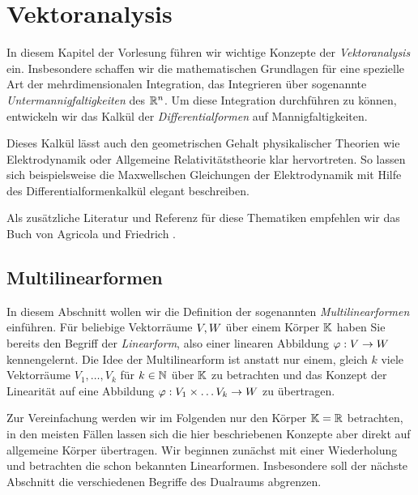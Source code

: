 \chapter{Vektoranalysis}
\label{\detokenize{vektoranalysis/vektoranalysis:vektoranalysis}}\label{\detokenize{vektoranalysis/vektoranalysis::doc}}
\par
In diesem Kapitel der Vorlesung führen wir wichtige Konzepte der \emph{Vektoranalysis} ein.
Insbesondere schaffen wir die mathematischen Grundlagen für eine spezielle Art der mehrdimensionalen Integration, das Integrieren über sogenannte \emph{Untermannigfaltigkeiten} des \(\mathbb{R}^n\).
Um diese Integration durchführen zu können, entwickeln wir das Kalkül der \emph{Differentialformen} auf Mannigfaltigkeiten.

\par
Dieses Kalkül lässt auch den geometrischen Gehalt physikalischer Theorien wie Elektrodynamik oder Allgemeine Relativitätstheorie klar hervortreten.
So lassen sich beispielsweise die Maxwellschen Gleichungen der Elektrodynamik mit Hilfe des Differentialformenkalkül elegant beschreiben.

\par
Als zusätzliche Literatur und Referenz für diese Thematiken empfehlen wir das Buch von Agricola und Friedrich \cite{AF13}.


\section{Multilinearformen}
\label{\detokenize{vektoranalysis/multilinear:multilinearformen}}\label{\detokenize{vektoranalysis/multilinear:s-multilinearformen}}\label{\detokenize{vektoranalysis/multilinear::doc}}
\par
In diesem Abschnitt wollen wir die Definition der sogenannten \emph{Multilinearformen} einführen.
Für beliebige Vektorräume \(V, W\) über einem Körper \(\mathbb{K}\) haben Sie bereits den Begriff der \emph{Linearform}, also einer linearen Abbildung \(\varphi:V\rightarrow W\) kennengelernt.
Die Idee der Multilinearform ist anstatt nur einem, gleich \(k\) viele Vektorräume \(V_1,\ldots,V_k\) für \(k \in \mathbb{N}\) über \(\mathbb{K}\) zu betrachten und das Konzept der Linearität auf eine Abbildung \(\varphi:V_1\times\ldots V_k\rightarrow W\) zu übertragen.

\par
Zur Vereinfachung werden wir im Folgenden nur den Körper \(\mathbb{K}=\mathbb{R}\) betrachten, in den meisten Fällen lassen sich die hier beschriebenen Konzepte aber direkt auf allgemeine Körper übertragen.
Wir beginnen zunächst mit einer Wiederholung und betrachten die schon bekannten Linearformen.
Insbesondere soll der nächste Abschnitt die verschiedenen Begriffe des Dualraums abgrenzen.



